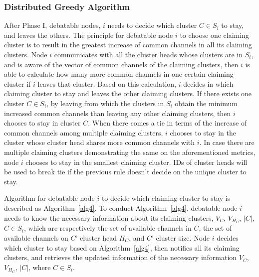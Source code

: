 
\subsubsection*{Distributed Greedy Algorithm}
After Phase I, debatable nodes, \eg $i$ needs to decide which cluster $C\in S_i$ to stay, and leaves the others.
The principle for debatable node $i$ to choose one claiming cluster is to result in the greatest increase of common channels in all its claiming clusters.
Node $i$ communicates with all the cluster heads whose clusters are in $S_i$, and is aware of the vector of common channels of the claiming clusters, then $i$ is able to calculate how many more common channels in one certain claiming cluster if $i$ leaves that cluster.
Based on this calculation, $i$ decides in which claiming cluster to stay and leaves the other claiming clusters.
If there exists one cluster $C\in S_i$, by leaving from which the clusters in $S_i$ obtain the minimum increased common channels than leaving any other claiming clusters, then $i$ chooses to stay in cluster $C$.
When there comes a tie in terms of the increase of common channels among multiple claiming clusters, $i$ chooses to stay in the cluster whose cluster head shares more common channels with $i$.
In case there are multiple claiming clusters demonstrating the same on the aforementioned metrics, node $i$ chooses to stay in the smallest claiming cluster.
IDs of cluster heads will be used to break tie if the previous rule doesn't decide on the unique cluster to stay.

Algorithm for debatable node $i$ to decide which claiming cluster to stay is described as Algorithm~\ref{alg4}.
To conduct Algorithm~\ref{alg4}, debatable node $i$ needs to know the necessary information about its claiming clusters, \ie $V_C$, $V_{H_C}$, $|C|$,$C\in S_i$, which are respectively the set of available channels in $C$, the set of available channels on $C$' cluster head $H_C$, and $C$' cluster size.
Node $i$ decides which cluster to stay based on Algorithm~\ref{alg4}, then notifies all its claiming clusters, and retrieves the updated information of the necessary information $V_C$, $V_{H_C}$, $|C|$, where $C\in S_i$.

